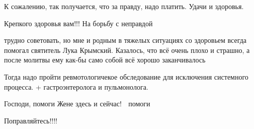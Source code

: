 \begin{itemize}
К сожалению, так получается, что за правду, надо платить.
Удачи и здоровья.

 
Крепкого здоровья вам!!! На борьбу с неправдой

 

трудно советовать, но мне и родным в тяжелых ситуациях со здоровьем всегда
помогал святитель Лука Крымский. Казалось, что всё очень плохо и страшно, а
после молитвы ему как-бы само собой всё хорошо заканчивалось


 

Тогда надо пройти ревмотологичекое обследование для исключения системного
процесса. + гастроэнтеролога и пульмонолога.

 
Господи, помоги Жене здесь и сейчас! 🙏 помоги

 
Поправляйтесь!!!!

\end{itemize}

